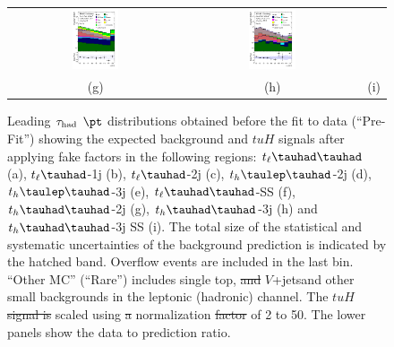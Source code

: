 \documentclass[PAPER, coverpage, atlasdraft=true, texlive=2016, UKenglish]{\ATLASLATEXPATH atlasdoc}
\providecommand{\DIFadd}[1]{{\protect\color{blue}\uwave{#1}}} %
\providecommand{\DIFdel}[1]{{\protect\color{red}\sout{#1}}}                      %
\providecommand{\DIFaddFL}[1]{\DIFadd{#1}} %
\providecommand{\DIFdelFL}[1]{\DIFdel{#1}} %
\providecommand{\DIFaddbeginFL}{} %
\providecommand{\DIFaddendFL}{} %
\providecommand{\DIFdelbeginFL}{} %
\providecommand{\DIFdelendFL}{} %
\begin{document}
\begin{figure}[H]
\begin{tabular}{@{}ccc@{}}
\includegraphics[page=1,width=0.28\textwidth]{figures/new_pt/log_or_nolog/tuH_reg2mtau1b3jos_log_.pdf}&
\includegraphics[page=1,width=0.28\textwidth]{figures/new_pt/log_or_nolog/tuH_reg2mtau1b3jss_log_.pdf}\\
(g) & (h) & (i)\\
\end{tabular}
\caption{Leading $\tau_\text{had}$ $\pt$  distributions obtained before the fit to data (``Pre-Fit'') showing 
  the expected background and $tuH$ signals after applying fake factors in the following regions: $t_{\ell}\thadhad$ (a),
 $t_{\ell}\tauhad$-1j (b),  $t_{\ell}\tauhad$-2j (c), $t_h\tlhad$-2j (d), $t_h\tlhad$-3j (e), $t_{\ell}\thadhad$-SS  (f), $t_h\thadhad$-2j (g), $t_h\thadhad$-3j (h) and $t_h\thadhad$-3j SS (i).
 The total size of the statistical and systematic uncertainties of the background prediction is indicated by the hatched band.
 Overflow events are included in the last bin. ``Other MC'' (``Rare'') includes single top, \DIFdelbeginFL \DIFdelFL{and }\DIFdelendFL $V$+jets\DIFaddbeginFL \DIFaddFL{, }\DIFaddendFL and other small backgrounds in the leptonic (hadronic) channel. The $tuH$ \DIFdelbeginFL \DIFdelFL{signal is }\DIFdelendFL \DIFaddbeginFL \DIFaddFL{signals are }\DIFaddendFL scaled using
 \DIFdelbeginFL \DIFdelFL{a }\DIFdelendFL normalization \DIFdelbeginFL \DIFdelFL{factor }\DIFdelendFL \DIFaddbeginFL \DIFaddFL{factors }\DIFaddendFL of 2 to 50.   
The lower panels show the data to prediction ratio.}
\label{fig:taupt_prefit}
\end{figure}
\end{document}
